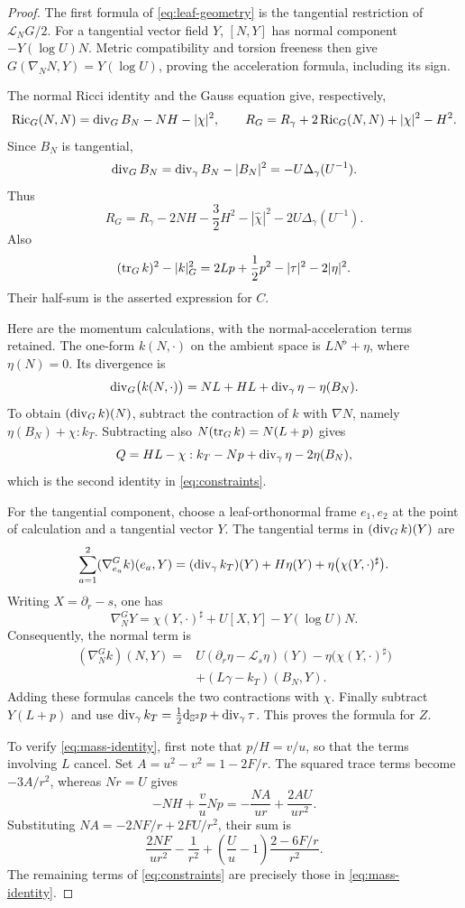 \begin{proof}
The first formula of \eqref{eq:leaf-geometry} is the tangential restriction
of $\mathcal L_NG/2$. For a tangential vector field $Y$,
$[N,Y]$ has normal component $-Y(\log U)N$. Metric compatibility and
torsion freeness then give $G(\nabla_NN,Y)=Y(\log U)$, proving the
acceleration formula, including its sign.

The normal Ricci identity and the Gauss equation give, respectively,
\[
 \operatorname{Ric}_G(N,N)=\operatorname{div}_G B_N-NH-|\chi|^2,
 \qquad
 R_G=R_\gamma+2\operatorname{Ric}_G(N,N)+|\chi|^2-H^2.
\]
Since $B_N$ is tangential,
\[
 \operatorname{div}_G B_N
 =\operatorname{div}_\gamma B_N-|B_N|^2
 =-U\Delta_\gamma(U^{-1}).
\]
Thus
\[
 R_G=R_\gamma-2NH-\frac32H^2-|\widehat\chi|^2
                 -2U\Delta_\gamma(U^{-1}).
\]
Also
\[
 (\operatorname{tr}_G k)^2-|k|_G^2
 =2Lp+\frac12p^2-|\tau|^2-2|\eta|^2.
\]
Their half-sum is the asserted expression for $C$.

Here are the momentum calculations, with the normal-acceleration terms
retained. The one-form $k(N,\cdot)$ on the ambient space is
$L N^\flat+\eta$, where $\eta(N)=0$. Its divergence is
\[
 \operatorname{div}_G\bigl(k(N,\cdot)\bigr)
 =NL+HL+\operatorname{div}_\gamma\eta-\eta(B_N).
\]
To obtain $(\operatorname{div}_G k)(N)$, subtract the contraction of $k$ with
$\nabla N$, namely $\eta(B_N)+\chi:k_T$. Subtracting also
$N(\operatorname{tr}_Gk)=N(L+p)$ gives
\[
 Q=HL-\chi:k_T-Np+\operatorname{div}_\gamma\eta-2\eta(B_N),
\]
which is the second identity in \eqref{eq:constraints}.

For the tangential component, choose a leaf-orthonormal frame
$e_1,e_2$ at the point of calculation and a tangential vector $Y$.
The tangential terms in $(\operatorname{div}_Gk)(Y)$ are
\[
 \sum_{a=1}^2(\nabla^G_{e_a}k)(e_a,Y)
 = (\operatorname{div}_\gamma k_T)(Y)+H\eta(Y)
     +\eta\bigl(\chi(Y,\cdot)^\sharp\bigr).
\]
Writing $X=\partial_r-s$, one has
\[
 \nabla^G_NY
 =\chi(Y,\cdot)^\sharp+U[X,Y]-Y(\log U)N.
\]
Consequently, the normal term is
\[
 \begin{split}
 (\nabla^G_Nk)(N,Y)
 ={}&U(\partial_r\eta-\mathcal L_s\eta)(Y)
       -\eta\bigl(\chi(Y,\cdot)^\sharp\bigr)\\
    &+(L\gamma-k_T)(B_N,Y).
 \end{split}
\]
Adding these formulas cancels the two contractions with $\chi$.
Finally subtract $Y(L+p)$ and use
$\operatorname{div}_\gamma k_T=\tfrac12\mathrm d_{\mathbb S^2}p
+\operatorname{div}_\gamma\tau$. This proves the formula for $Z$.

To verify \eqref{eq:mass-identity}, first note that $p/H=v/u$, so that
the terms involving $L$ cancel. Set $A=u^2-v^2=1-2F/r$.
The squared trace terms become $-3A/r^2$, whereas $Nr=U$ gives
\[
 -NH+\frac vuNp=-\frac{NA}{ur}+\frac{2AU}{ur^2}.
\]
Substituting $NA=-2NF/r+2FU/r^2$, their sum is
\[
 \frac{2NF}{ur^2}-\frac1{r^2}
       +\left(\frac Uu-1\right)\frac{2-6F/r}{r^2}.
\]
The remaining terms of \eqref{eq:constraints} are precisely those in
\eqref{eq:mass-identity}.
\end{proof}

